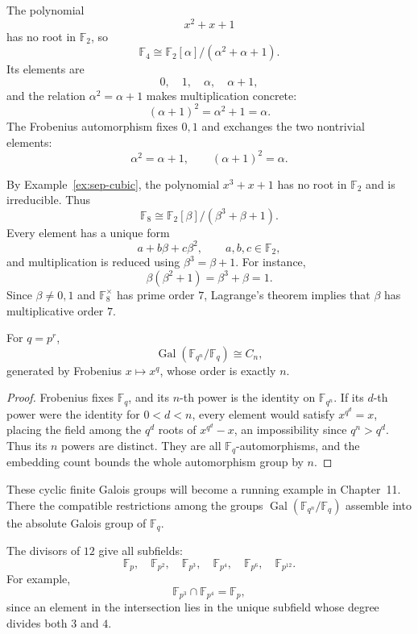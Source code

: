 \begin{example}
The polynomial
\[
x^2+x+1
\]
has no root in \(\mathbb F_2\), so
\[
\mathbb F_4\cong\mathbb F_2[\alpha]/(\alpha^2+\alpha+1).
\]
Its elements are
\[
0,\quad1,\quad\alpha,\quad\alpha+1,
\]
and the relation \(\alpha^2=\alpha+1\) makes multiplication concrete:
\[
(\alpha+1)^2=\alpha^2+1=\alpha.
\]
The Frobenius automorphism fixes \(0,1\) and exchanges the two nontrivial
elements:
\[
\alpha^2=\alpha+1,\qquad(\alpha+1)^2=\alpha.
\]
\end{example}

\begin{example}
By Example~\ref{ex:sep-cubic}, the polynomial \(x^3+x+1\) has no root in
\(\mathbb F_2\) and is irreducible.  Thus
\[
\mathbb F_8\cong\mathbb F_2[\beta]/(\beta^3+\beta+1).
\]
Every element has a unique form
\[
a+b\beta+c\beta^2,
\qquad a,b,c\in\mathbb F_2,
\]
and multiplication is reduced using \(\beta^3=\beta+1\).  For instance,
\[
\beta(\beta^2+1)=\beta^3+\beta=1.
\]
Since \(\beta\ne0,1\) and \(\mathbb F_8^\times\) has prime order \(7\),
Lagrange's theorem implies that \(\beta\) has multiplicative order \(7\).
\end{example}

\begin{proposition}\label{prop:frobenius-order}
For \(q=p^r\),
\[
\operatorname{Gal}(\mathbb F_{q^n}/\mathbb F_q)\cong C_n,
\]
generated by Frobenius \(x\mapsto x^q\), whose order is exactly \(n\).
\end{proposition}
\begin{proof}
Frobenius fixes \(\mathbb F_q\), and its \(n\)-th power is the identity on
\(\mathbb F_{q^n}\).  If its \(d\)-th power were the identity for
\(0<d<n\), every element would satisfy \(x^{q^d}=x\), placing the field
among the \(q^d\) roots of \(x^{q^d}-x\), an impossibility since
\(q^n>q^d\).  Thus its \(n\) powers are distinct.  They are all
\(\mathbb F_q\)-automorphisms, and the embedding count bounds the whole
automorphism group by \(n\).
\end{proof}

These cyclic finite Galois groups will become a running example in
Chapter~11. There the compatible restrictions among the groups
\(\operatorname{Gal}(\mathbb F_{q^n}/\mathbb F_q)\) assemble into the
absolute Galois group of \(\mathbb F_q\).

\begin{example}
The divisors of \(12\) give all subfields:
\[
\mathbb F_p,\quad
\mathbb F_{p^2},\quad
\mathbb F_{p^3},\quad
\mathbb F_{p^4},\quad
\mathbb F_{p^6},\quad
\mathbb F_{p^{12}}.
\]
For example,
\[
\mathbb F_{p^3}\cap\mathbb F_{p^4}=\mathbb F_p,
\]
since an element in the intersection lies in the unique subfield whose
degree divides both \(3\) and \(4\).
\end{example}


